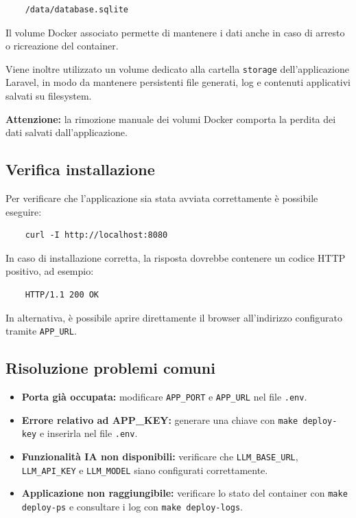 \documentclass[a4paper,10pt]{article}
\begin{document}
\begin{lstlisting}
    /data/database.sqlite
\end{lstlisting}

Il volume Docker associato permette di mantenere i dati anche in caso di arresto o ricreazione del container.

Viene inoltre utilizzato un volume dedicato alla cartella \texttt{storage} dell'applicazione Laravel, in modo da mantenere persistenti file generati, log e contenuti applicativi salvati su filesystem.

\textbf{Attenzione:} la rimozione manuale dei volumi Docker comporta la perdita dei dati salvati dall'applicazione.

\subsection{Verifica installazione}
Per verificare che l'applicazione sia stata avviata correttamente è possibile eseguire:

\begin{lstlisting}
    curl -I http://localhost:8080
\end{lstlisting}

In caso di installazione corretta, la risposta dovrebbe contenere un codice HTTP positivo, ad esempio:

\begin{lstlisting}
    HTTP/1.1 200 OK
\end{lstlisting}

In alternativa, è possibile aprire direttamente il browser all'indirizzo configurato tramite \texttt{APP\_URL}.

\subsection{Risoluzione problemi comuni}
\begin{itemize}
    \item \textbf{Porta già occupata:} modificare \texttt{APP\_PORT} e \texttt{APP\_URL} nel file \texttt{.env}.
    \item \textbf{Errore relativo ad APP\_KEY:} generare una chiave con \texttt{make deploy-key} e inserirla nel file \texttt{.env}.
    \item \textbf{Funzionalità IA non disponibili:} verificare che \texttt{LLM\_BASE\_URL}, \texttt{LLM\_API\_KEY} e \texttt{LLM\_MODEL} siano configurati correttamente.
    \item \textbf{Applicazione non raggiungibile:} verificare lo stato del container con \texttt{make deploy-ps} e consultare i log con \texttt{make deploy-logs}.
\end{itemize}
\end{document}
